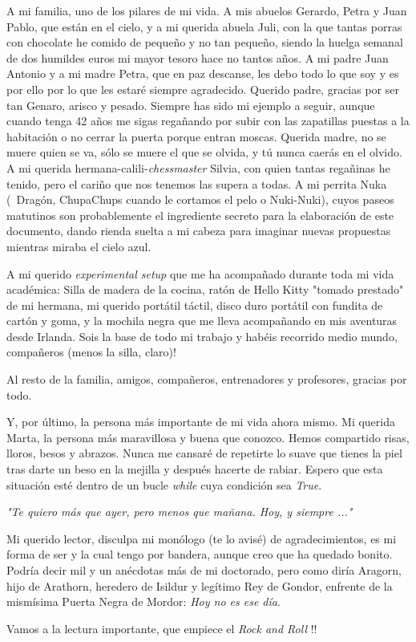 A mi familia, uno de los pilares de mi vida. A mis abuelos Gerardo, Petra y Juan Pablo, que están en el cielo, y a mi querida abuela Juli, con la que tantas porras con chocolate he comido de pequeño y no tan pequeño, siendo la huelga semanal de dos humildes euros mi mayor tesoro hace no tantos años. A mi padre Juan Antonio y a mi madre Petra, que en paz descanse, les debo todo lo que soy y es por ello por lo que les estaré siempre agradecido. Querido padre, gracias por ser tan Genaro, arisco y pesado. Siempre has sido mi ejemplo a seguir, aunque cuando tenga 42 años me sigas regañando por subir con las zapatillas puestas a la habitación o no cerrar la puerta porque entran moscas. Querida madre, no se muere quien se va, sólo se muere el que se olvida, y tú nunca caerás en el olvido. A mi querida hermana-calili-\textit{chessmaster} Silvia, con quien tantas regañinas he tenido, pero el cariño que nos tenemos las supera a todas. A mi perrita Nuka (\aka \ Dragón, ChupaChups cuando le cortamos el pelo o Nuki-Nuki), cuyos paseos matutinos son probablemente el ingrediente secreto para la elaboración de este documento, dando rienda suelta a mi cabeza para imaginar nuevas propuestas mientras miraba el cielo azul. 

A mi querido \textit{experimental setup} que me ha acompañado durante toda mi vida académica: Silla de madera de la cocina, ratón de Hello Kitty "tomado prestado" de mi hermana, mi querido portátil táctil, disco duro portátil con fundita de cartón y goma, y la mochila negra que me lleva acompañando en mis aventuras desde Irlanda. Sois la base de todo mi trabajo y habéis recorrido medio mundo, compañeros (menos la silla, claro)!

Al resto de la familia, amigos, compañeros, entrenadores y profesores, gracias por todo.

Y, por último, la persona más importante de mi vida ahora mismo. Mi querida Marta, la persona más maravillosa y buena que conozco. Hemos compartido risas, lloros, besos y abrazos. Nunca me cansaré de repetirte lo suave que tienes la piel tras darte un beso en la mejilla y después hacerte de rabiar. Espero que esta situación esté dentro de un bucle \textit{while} cuya condición sea \textit{True}. 

\begin{center}
\textit{"Te quiero más que ayer, pero menos que mañana. Hoy, y siempre ..."}
\end{center}

Mi querido lector, disculpa mi monólogo (te lo avisé) de agradecimientos, es mi forma de ser y la cual tengo por bandera, aunque creo que ha quedado bonito. Podría decir mil y un anécdotas más de mi doctorado, pero como diría Aragorn, hijo de Arathorn, heredero de Isildur y legítimo Rey de Gondor, enfrente de la mismísima Puerta Negra de Mordor: \textit{Hoy no es ese día}. 

Vamos a la lectura importante, que empiece el \textit{Rock and Roll} !!


